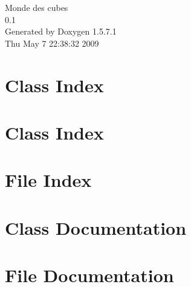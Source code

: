 \documentclass[a4paper]{book}
\begin{document}
\begin{titlepage}
\vspace*{7cm}
\begin{center}
{\Large Monde des cubes \\[1ex]\large 0.1 }\\
\vspace*{1cm}
{\large Generated by Doxygen 1.5.7.1}\\
\vspace*{0.5cm}
{\small Thu May 7 22:38:32 2009}\\
\end{center}
\end{titlepage}
\clearemptydoublepage
{}
\tableofcontents
\clearemptydoublepage
{}
\chapter{Class Index}

\chapter{Class Index}

\chapter{File Index}

\chapter{Class Documentation}


















\chapter{File Documentation}













\printindex
\end{document}
